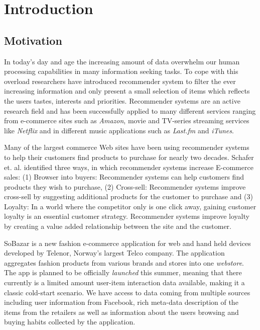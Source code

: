 
\chapter{Introduction}
\minitoc
\setcounter{page}{1}

\clearpage

\section{Motivation}
\label{sec:motivation}


In today's day and age the increasing amount of data overwhelm our human
processing capabilities in many information seeking tasks. To cope with this
overload researchers have introduced recommender system to filter the ever
increasing information and only present a small selection of items which
reflects the users tastes, interests and priorities. Recommender systems are an
active research field and has been successfully applied to many different
services ranging from e-commerce sites such as \emph{Amazon}, movie and
TV-series streaming services like \emph{Netflix} and in different music
applications such as \emph{Last.fm} and \emph{iTunes}.

Many of the largest commerce Web sites have been using recommender systems to
help their customers find products to purchase for nearly two decades.
Schafer et. al. \cite{Schafer1999} identified three ways, in which recommender
systems increase E-commerce sales: (1) Browser into buyers: Recommender systems
can help customers find products they wish to purchase, (2) Cross-sell:
Recommender systems improve cross-sell by suggesting additional products for
the customer to purchase and (3) Loyalty: In a world where the competitor only
is one click away, gaining customer loyalty is an essential customer strategy.
Recommender systems improve loyalty by creating a value added relationship
between the site and the customer.

SoBazar is a new fashion e-commerce application for web and hand held devices
developed by Telenor, Norway's largest Telco company. The application
aggregates fashion products from various brands and stores into one
\emph{webstore}. The app is planned to be officially \emph{launched} this
summer, meaning that there currently is a limited amount user-item interaction
data available, making it a classic cold-start scenario. We have access to data
coming from multiple sources including user information from Facebook, rich
meta-data description of the items from the retailers as well as information
about the users browsing and buying habits collected by the application.

